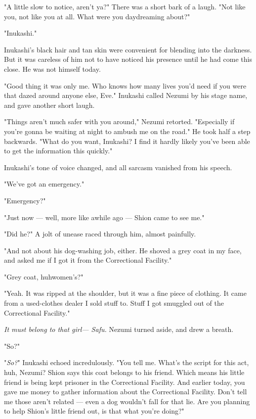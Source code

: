 "A little slow to notice, aren't ya?" There was a short bark of a laugh.
"Not like you, not like you at all. What were you daydreaming about?"

"Inukashi."

Inukashi's black hair and tan skin were convenient for blending into the
darkness. But it was careless of him not to have noticed his presence
until he had come this close. He was not himself today.

"Good thing it was only me. Who knows how many lives you'd need if you
were that dazed around anyone else, Eve." Inukashi called Nezumi by his
stage name, and gave another short laugh.

"Things aren't much safer with you around," Nezumi retorted. "Especially
if you're gonna be waiting at night to ambush me on the road." He took
half a step backwards. "What do you want, Inukashi? I find it hardly
likely you've been able to get the information this quickly."

Inukashi's tone of voice changed, and all sarcasm vanished from his
speech.

"We've got an emergency."

"Emergency?"

"Just now --- well, more like awhile ago --- Shion came to see me."

"Did he?" A jolt of unease raced through him, almost painfully.

"And not about his dog-washing job, either. He shoved a grey coat in my
face, and asked me if I got it from the Correctional Facility."

"Grey coat, huh\el women's?"

"Yeah. It was ripped at the shoulder, but it was a fine piece of
clothing. It came from a used-clothes dealer I sold stuff to. Stuff I
got smuggled out of the Correctional Facility."

\emph{It must belong to that girl--- Safu.} Nezumi turned aside, and drew a
breath.

"So?"

"\emph{So?}" Inukashi echoed incredulously. "You tell me. What's the script for
this act, huh, Nezumi? Shion says this coat belongs to his friend. Which
means his little friend is being kept prisoner in the Correctional
Facility. And earlier today, you gave me money to gather information
about the Correctional Facility. Don't tell me those aren't related ---
even a dog wouldn't fall for that lie. Are you planning to help Shion's
little friend out, is that what you're doing?"

